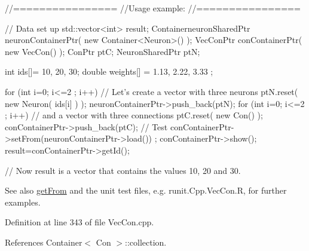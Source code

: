 \begin{DoxyCode}
        //================
        //Usage example:
        //================

        // Data set up
                std::vector<int> result;
                ContainerneuronSharedPtr neuronContainerPtr( new Container<Neuron>() );
                VecConPtr conContainerPtr( new VecCon() );
                ConPtr    ptC;
                NeuronSharedPtr ptN;

                int ids[]= {10, 20, 30};
                double weights[] = {1.13, 2.22, 3.33 };

                for (int i=0; i<=2 ; i++) {                             // Let's 
      create a vector with three neurons
                        ptN.reset( new Neuron( ids[i] ) );
                        neuronContainerPtr->push_back(ptN);
                }
                for (int i=0; i<=2 ; i++) {                             // and a 
      vector with three connections
                        ptC.reset( new Con() );
                        conContainerPtr->push_back(ptC);
                }
        // Test
                conContainerPtr->setFrom(neuronContainerPtr->load()) ;
                conContainerPtr->show();
                result=conContainerPtr->getId();

        // Now result is a vector that contains the values 10, 20 and 30.
\end{DoxyCode}


\begin{DoxySeeAlso}{See also}
\hyperlink{classvec_con_ae72d00aedcd054e690f1dcf2ca5ac2c2}{getFrom} and the unit test files, e.g. runit.Cpp.VecCon.R, for further examples. 
\end{DoxySeeAlso}


Definition at line 343 of file VecCon.cpp.



References Container$<$ Con $>$::collection.


